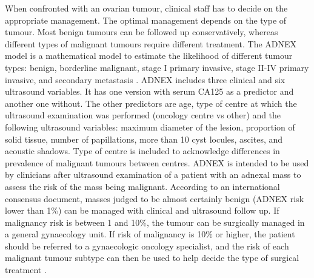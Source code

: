 When confronted with an ovarian tumour, clinical staff has to decide on the appropriate management. The optimal management depends on the type of tumour. Most benign tumours can be followed up conservatively, whereas different types of malignant tumours require different treatment. The \gls{ADNEX} model is a mathematical model to estimate the likelihood of different tumour types: benign, borderline malignant, stage I primary invasive, stage II-IV primary invasive, and secondary metastasis \cite{vancalsterEvaluatingRiskOvarian2014}. \gls{ADNEX} includes three clinical and six ultrasound variables. It has one version with serum \gls{CA125} as a predictor and another one without. The other predictors are age, type of centre at which the ultrasound examination was performed (oncology centre vs other) and the following ultrasound variables: maximum diameter of the lesion, proportion of solid tissue, number of papillations, more than 10 cyst locules, ascites, and acoustic shadows. Type of centre is included to acknowledge differences in prevalence of malignant tumours between centres. \gls{ADNEX} is intended to be used by clinicians after ultrasound examination of a patient with an adnexal mass to assess the risk of the mass being malignant. According to an international consensus document, masses judged to be almost certainly benign (\gls{ADNEX} risk lower than 1\%) can be managed with clinical and ultrasound follow up. If malignancy risk is between 1 and 10\%, the tumour can be surgically managed in a general gynaecology unit. If risk of malignancy is 10\% or higher, the patient should be referred to a gynaecologic oncology specialist, and the risk of each malignant tumour subtype can then be used to help decide the type of surgical treatment \cite{timmermanESGOISUOGIOTA2021}.

